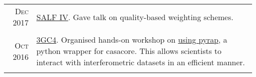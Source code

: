\documentclass[11pt,a4paper,notitlepage]{article}
\begin{document}
\begin{tabular}{r|p{12.5cm}}
	\textsc{Dec 2017} & \href{http://www.physics.usyd.edu.au/salf_iv/}{SALF IV}. Gave talk on quality-based weighting schemes.\\
	\multicolumn{2}{c}{} \\
	
	\textsc{Oct 2016} & \href{http://www.ast.uct.ac.za/ast/meetings-workshops/3gc4}{3GC4}. Organised hands-on workshop on \href{https://github.com/ebonnassieux/Teaching/blob/master/PyrapTutorial.ipynb}{using pyrap}, a python wrapper for casacore. This allows scientists to interact with interferometric datasets in an efficient manner.\\
	\multicolumn{2}{c}{} \\
	
\end{tabular}







\end{document}
